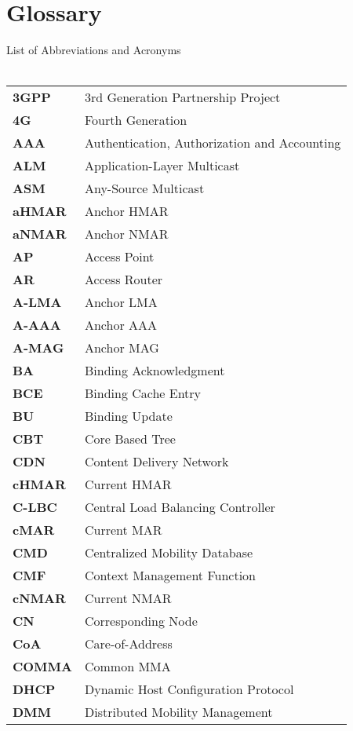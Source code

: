 \chapter*{Glossary}
List of Abbreviations and Acronyms\\
\\
\begin{center}
\begin{longtable}{p{5cm}p{8.8cm}}
\textbf{3GPP} & 3rd Generation Partnership Project\\
\textbf{4G} & Fourth Generation\\
\textbf{AAA} & Authentication, Authorization and Accounting\\
\textbf{ALM} & Application-Layer Multicast\\
\textbf{ASM} & Any-Source Multicast\\
\textbf{aHMAR} & Anchor HMAR \\
\textbf{aNMAR} & Anchor NMAR\\
\textbf{AP} & Access Point\\
\textbf{AR} & Access Router\\
\textbf{A-LMA} & Anchor LMA\\
\textbf{A-AAA} & Anchor AAA\\
\textbf{A-MAG} & Anchor MAG\\
\textbf{BA} & Binding Acknowledgment\\
\textbf{BCE} & Binding Cache Entry\\
\textbf{BU} & Binding Update\\
\textbf{CBT} & Core Based Tree \\
\textbf{CDN} & Content Delivery Network\\
\textbf{cHMAR} & Current HMAR \\
\textbf{C-LBC} & Central Load Balancing Controller\\
\textbf{cMAR} & Current MAR\\
\textbf{CMD} & Centralized Mobility Database\\
\textbf{CMF} & Context Management Function\\
\textbf{cNMAR} & Current NMAR\\
\textbf{CN} & Corresponding Node\\
\textbf{CoA} & Care-of-Address\\
\textbf{COMMA} & Common MMA\\
\textbf{DHCP} & Dynamic Host Configuration Protocol\\
\textbf{DMM} & Distributed Mobility Management\\

\end{longtable}
\end{center}
